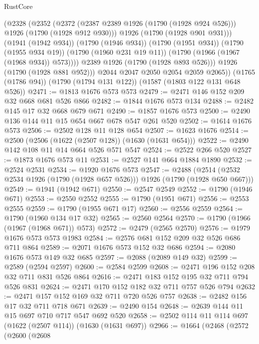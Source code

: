 \begin{lexlean}{RustCore}
\begin{coremodule}
              (@2328
                (@2352
                  (@2372
                    (@2387 @2389 @1926 (@1790 (@1928 @924 @526)))
                    @1926
                    (@1790 (@1928 @912 @930)))
                  @1926
                  (@1790 (@1928 @901 @931)))
                (@1941 (@1942 @934))
                (@1790 (@1946 @934))
                (@1790 (@1951 @934))
                (@1790 (@1955 @934 @19))
                (@1790 (@1960 @231 @19 @11))
                (@1790 (@1966 (@1967 (@1968 @934)) @573))))
            @2389
            @1926
            (@1790 (@1928 @893 @526)))
          @1926
          (@1790 (@1928 @881 @952)))
        @2044
        @2047
        @2050
        @2054
        @2059
        @2065))
    (@1765 (@1786 @94))
    (@1790 (@1794 @131 @122))
    (@1587 (@1803 @122 @131 @648 @526))
@2471 := @1813 @1676 @573 @573
@2479 := @2471 @146 @152 @209 @32 @668 @681 @526 @866
@2482 := @1844 @1676 @573 @134
@2488 := @2482 @145 @17 @32 @668 @679 @671
@2490 := @1857 @1676 @573
@2500 := @2490 @136 @144 @11 @15 @654 @667 @678 @547 @261 @520
@2502 := @1614 @1676 @573
@2506 := @2502 @128 @11 @128 @654
@2507 := @1623 @1676
@2514 := @2500 (@2506 (@1622 (@2507 @128)) (@1630 (@1631 @654)))
@2522 := @2490 @142 @108 @11 @14 @664 @526 @571 @547
@2524 := @2522 @266 @520
@2527 := @1873 @1676 @573 @11
@2531 := @2527 @141 @664 @1884 @1890
@2532 := @2524 @2531
@2534 := @1920 @1676 @573
@2547 := @2488 (@2514 (@2532 @2534 @1926 (@1790 (@1928 @657 @526))) @1926 (@1790 (@1928 @650 @667)))
@2549 := @1941 (@1942 @671)
@2550 := @2547 @2549
@2552 := @1790 (@1946 @671)
@2553 := @2550 @2552
@2555 := @1790 (@1951 @671)
@2556 := @2553 @2555
@2559 := @1790 (@1955 @671 @17)
@2560 := @2556 @2559
@2564 := @1790 (@1960 @134 @17 @32)
@2565 := @2560 @2564
@2570 := @1790 (@1966 (@1967 (@1968 @671)) @573)
@2572 := @2479 (@2565 @2570)
@2576 := @1979 @1676 @573 @573 @1983
@2584 := @2576 @681 @152 @209 @32 @526 @686 @711 @864
@2589 := @2071 @1676 @573 @152 @32 @686
@2594 := @2080 @1676 @573 @149 @32 @685
@2597 := @2088 (@2089 @149 @32)
@2599 := @2589 (@2594 @2597)
@2600 := @2584 @2599
@2608 := @2471 @196 @152 @208 @32 @711 @831 @526 @864
@2616 := @2471 @183 @152 @195 @32 @711 @794 @526 @831
@2624 := @2471 @170 @152 @182 @32 @711 @757 @526 @794
@2632 := @2471 @157 @152 @169 @32 @711 @720 @526 @757
@2638 := @2482 @156 @17 @32 @711 @718 @671
@2639 := @2490 @154
@2648 := @2639 @144 @11 @15 @697 @710 @717 @547 @692 @520
@2658 := @2502 @114 @11 @114 @697 (@1622 (@2507 @114)) (@1630 (@1631 @697))
@2966 := @1664
    (@2468
      (@2572
        (@2600
          (@2608

\end{coremodule}
\end{lexlean}
